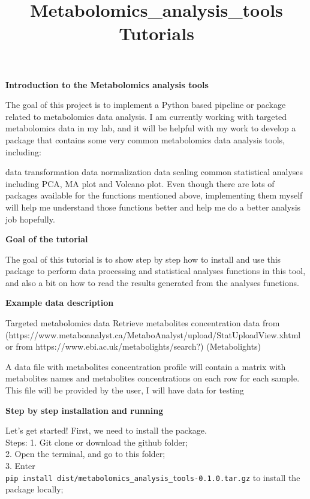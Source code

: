 \documentclass[
  letterpaper,
  DIV=11,
  numbers=noendperiod]{scrartcl}
\title{Metabolomics\_analysis\_tools Tutorials}
\author{}
\date{}
\begin{document}
\maketitle
\ifdefined\Shaded\renewenvironment{Shaded}{\begin{tcolorbox}[boxrule=0pt, frame hidden, borderline west={3pt}{0pt}{shadecolor}, sharp corners, interior hidden, enhanced, breakable]}{\end{tcolorbox}}\fi

\textbf{Introduction to the Metabolomics analysis tools}

The goal of this project is to implement a Python based pipeline or
package related to metabolomics data analysis. I am currently working
with targeted metabolomics data in my lab, and it will be helpful with
my work to develop a package that contains some very common metabolomics
data analysis tools, including:

data transformation data normalization data scaling common statistical
analyses including PCA, MA plot and Volcano plot. Even though there are
lots of packages available for the functions mentioned above,
implementing them myself will help me understand those functions better
and help me do a better analysis job hopefully.

\textbf{Goal of the tutorial}

The goal of this tutorial is to show step by step how to install and use
this package to perform data processing and statistical analyses
functions in this tool, and also a bit on how to read the results
generated from the analyses functions.

\textbf{Example data description}

Targeted metabolomics data Retrieve metabolites concentration data from
(https://www.metaboanalyst.ca/MetaboAnalyst/upload/StatUploadView.xhtml
or from https://www.ebi.ac.uk/metabolights/search?) (Metabolights)

A data file with metabolites concentration profile will contain a matrix
with metabolites names and metabolites concentrations on each row for
each sample. This file will be provided by the user, I will have data
for testing

\textbf{Step by step installation and running}

Let's get started! First, we need to install the package.\\
Steps: 1. Git clone or download the github folder;\\
2. Open the terminal, and go to this folder;\\
3. Enter\\
\texttt{pip\ install\ dist/metabolomics\_analysis\_tools-0.1.0.tar.gz}
to install the package locally;
\end{document}
